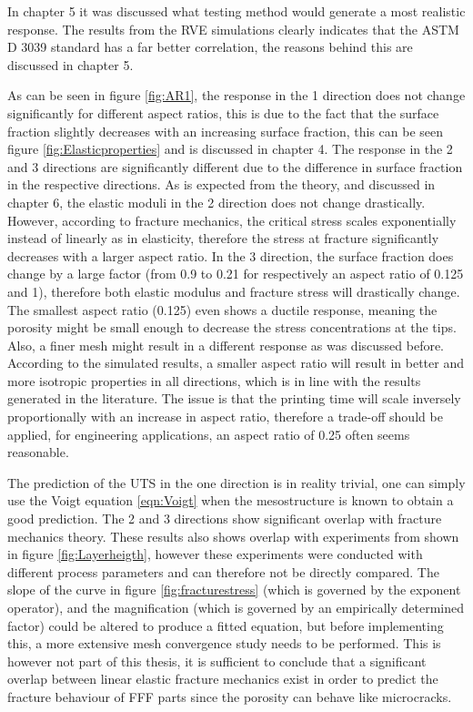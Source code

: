 In chapter 5 it was discussed what testing method would generate a most realistic response. The results from the RVE simulations clearly indicates that the ASTM D 3039 standard has a far better correlation, the reasons behind this are discussed in chapter 5.

As can be seen in figure \ref{fig:AR1}, the response in the 1 direction does not change significantly for different aspect ratios, this is due to the fact that the surface fraction slightly decreases with an increasing surface fraction, this can be seen figure \ref{fig:Elasticproperties} and is discussed in chapter 4. The response in the 2 and 3 directions are significantly different due to the difference in surface fraction in the respective directions. As is expected from the theory, and discussed in chapter 6, the elastic moduli in the 2 direction does not change drastically. However, according to fracture mechanics, the critical stress scales exponentially instead of linearly as in elasticity, therefore the stress at fracture significantly decreases with a larger aspect ratio. In the 3 direction, the surface fraction does change by a large factor (from 0.9 to 0.21 for respectively an aspect ratio of 0.125 and 1), therefore both elastic modulus and fracture stress will drastically change. The smallest aspect ratio (0.125) even shows a ductile response, meaning the porosity might be small enough to decrease the stress concentrations at the tips. Also, a finer mesh might result in a different response as was discussed before. 
According to the simulated results, a smaller aspect ratio will result in better and more isotropic properties in all directions, which is in line with the results generated in the literature. The issue is that the printing time will scale inversely proportionally with an increase in aspect ratio, therefore a trade-off should be applied, for engineering applications, an aspect ratio of 0.25 often seems reasonable. 

The prediction of the UTS in the one direction is in reality trivial, one can simply use the Voigt equation \ref{eqn:Voigt} when the mesostructure is known to obtain a good prediction.  The 2 and 3 directions show significant overlap with fracture mechanics theory. These results also shows overlap with experiments from \cite{Li2017TheProperties} shown in figure \ref{fig:Layerheigth}, however these experiments were conducted with different process parameters and can therefore not be directly compared. The slope of the curve in figure \ref{fig:fracturestress} (which is governed by the exponent operator), and the magnification (which is governed by an empirically determined factor) could be altered to produce a fitted equation, but before implementing this, a more extensive mesh convergence study needs to be performed. This is however not part of this thesis, it is sufficient to conclude that a significant overlap between linear elastic fracture mechanics exist in order to predict the fracture behaviour of FFF parts since the porosity can behave like microcracks. 

